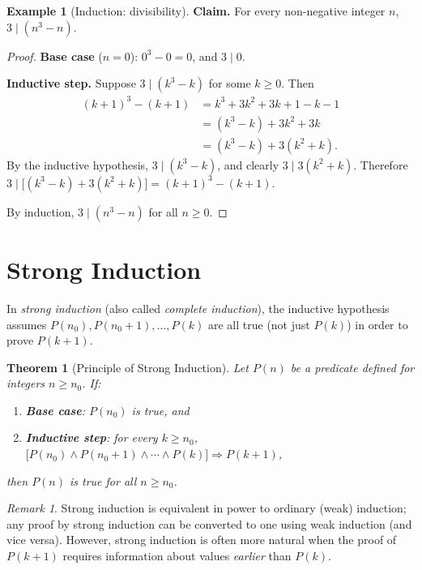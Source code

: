 \documentclass[12pt,a4paper,openany]{book}
\theoremstyle{definition}
\newtheorem{example}[definition]{Example}
\theoremstyle{plain}
\newtheorem{theorem}[definition]{Theorem}
\theoremstyle{remark}
\newtheorem{remark}[definition]{Remark}
\begin{document}
\begin{example}[Induction: divisibility]
\label{ex:induction-divisibility}
\textbf{Claim.} For every non-negative integer $n$, $3 \mid (n^3 - n)$.

\begin{proof}
\textbf{Base case} ($n = 0$): $0^3 - 0 = 0$, and $3 \mid 0$.

\medskip\noindent
\textbf{Inductive step.} Suppose $3 \mid (k^3 - k)$ for some $k \geq 0$. Then
\begin{align*}
  (k+1)^3 - (k+1)
  &= k^3 + 3k^2 + 3k + 1 - k - 1 \\
  &= (k^3 - k) + 3k^2 + 3k \\
  &= (k^3 - k) + 3(k^2 + k).
\end{align*}
By the inductive hypothesis, $3 \mid (k^3 - k)$, and clearly $3 \mid 3(k^2 + k)$.
Therefore $3 \mid \bigl[(k^3 - k) + 3(k^2 + k)\bigr] = (k+1)^3 - (k+1)$.

By induction, $3 \mid (n^3 - n)$ for all $n \geq 0$.
\end{proof}
\end{example}

\section{Strong Induction}
\label{sec:strong-induction}

In \emph{strong induction} (also called \emph{complete induction}), the inductive
hypothesis assumes $P(n_0), P(n_0 + 1), \dots, P(k)$ are all true (not just $P(k)$)
in order to prove $P(k+1)$.

\begin{theorem}[Principle of Strong Induction]
\label{thm:strong-induction}
Let $P(n)$ be a predicate defined for integers $n \geq n_0$. If:
\begin{enumerate}[nosep]
  \item \textbf{Base case}: $P(n_0)$ is true, and
  \item \textbf{Inductive step}: for every $k \geq n_0$,
        $\bigl[P(n_0) \land P(n_0+1) \land \cdots \land P(k)\bigr] \Rightarrow P(k+1)$,
\end{enumerate}
then $P(n)$ is true for all $n \geq n_0$.
\end{theorem}

\begin{remark}
\label{rem:strong-vs-weak}
Strong induction is equivalent in power to ordinary (weak) induction; any proof by
strong induction can be converted to one using weak induction (and vice versa).
However, strong induction is often more natural when the proof of $P(k+1)$ requires
information about values \emph{earlier} than $P(k)$.
\end{remark}
\end{document}
